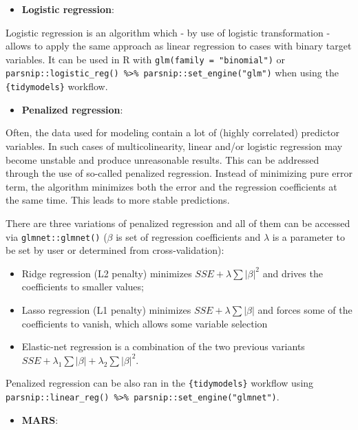 \documentclass[
]{krantz}
\providecommand{\tightlist}{%
  \setlength{\itemsep}{0pt}\setlength{\parskip}{0pt}}
\begin{document}
\begin{itemize}
\tightlist
\item
  \textbf{Logistic regression}:
\end{itemize}

Logistic regression is an algorithm which - by use of logistic transformation - allows to apply the same approach as linear regression to cases with binary target variables. It can be used in R with \texttt{glm(family\ =\ "binomial")} or \texttt{parsnip::logistic\_reg()\ \%\textgreater{}\%\ parsnip::set\_engine("glm")} when using the \texttt{\{tidymodels\}} workflow.

\begin{itemize}
\tightlist
\item
  \textbf{Penalized regression}:
\end{itemize}

Often, the data used for modeling contain a lot of (highly correlated) predictor variables. In such cases of multicolinearity, linear and/or logistic regression may become unstable and produce unreasonable results. This can be addressed through the use of so-called penalized regression. Instead of minimizing pure error term, the algorithm minimizes both the error and the regression coefficients at the same time. This leads to more stable predictions.

There are three variations of penalized regression and all of them can be accessed via \texttt{glmnet::glmnet()} (\(\beta\) is set of regression coefficients and \(\lambda\) is a parameter to be set by user or determined from cross-validation):

\begin{itemize}
\tightlist
\item
  Ridge regression (L2 penalty) minimizes \(SSE + \lambda \sum|\beta|^2\) and drives the coefficients to smaller values;
\item
  Lasso regression (L1 penalty) minimizes \(SSE + \lambda \sum|\beta|\) and forces some of the coefficients to vanish, which allows some variable selection
\item
  Elastic-net regression is a combination of the two previous variants \(SSE + \lambda_1 \sum|\beta| + \lambda_2 \sum|\beta|^2\).
\end{itemize}

Penalized regression can be also ran in the \texttt{\{tidymodels\}} workflow using \texttt{parsnip::linear\_reg()\ \%\textgreater{}\%\ parsnip::set\_engine("glmnet")}.

\begin{itemize}
\tightlist
\item
  \textbf{MARS}:
\end{itemize}
\end{document}
